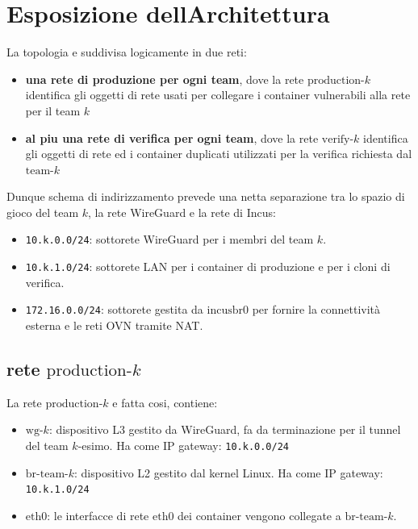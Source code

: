 \section{Esposizione
dell\textquotesingle Architettura}\label{esposizione-dellarchitettura}

La topologia e\textquotesingle{} suddivisa logicamente in due reti:

\begin{itemize}
\tightlist
\item
  \textbf{una rete di produzione per ogni team}, dove la rete
  \(\text{production-}k\) identifica gli oggetti di rete usati per
  collegare i container vulnerabili alla rete per il team \(k\)
\item
  \textbf{al piu\textquotesingle{} una rete di verifica per ogni team},
  dove la rete \(\text{verify-}k\) identifica gli oggetti di rete ed i
  container duplicati utilizzati per la verifica richiesta dal
  \(\text{team-}k\)
\end{itemize}

Dunque schema di indirizzamento prevede una netta separazione tra lo
spazio di gioco del team \(k\), la rete WireGuard e la rete di Incus:

\begin{itemize}
\tightlist
\item
  \passthrough{\lstinline!10.k.0.0/24!}: sottorete WireGuard per i
  membri del team \(k\).
\item
  \passthrough{\lstinline!10.k.1.0/24!}: sottorete LAN per i container
  di produzione e per i cloni di verifica.
\item
  \passthrough{\lstinline!172.16.0.0/24!}: sottorete gestita da
  \(\text{incusbr0}\) per fornire la connettività esterna e le reti OVN
  tramite NAT.
\end{itemize}

\subsection{\texorpdfstring{rete
\(\text{production-}k\)}{rete \textbackslash text\{production-\}k}}\label{rete-textproduction-k}

La rete \(\text{production-}k\) e\textquotesingle{} fatta cosi,
contiene:

\begin{itemize}
\tightlist
\item
  \(\text{wg-}k\): dispositivo L3 gestito da WireGuard, fa da
  terminazione per il tunnel del team \(k\)-esimo. Ha come IP gateway:
  \passthrough{\lstinline!10.k.0.0/24!}
\item
  \(\text{br-team-}k\): dispositivo L2 gestito dal kernel Linux. Ha come
  IP gateway: \passthrough{\lstinline!10.k.1.0/24!}
\item
  \(\text{eth0}\): le interfacce di rete \(\text{eth0}\) dei container
  vengono collegate a \(\text{br-team-}k\).
\end{itemize}

